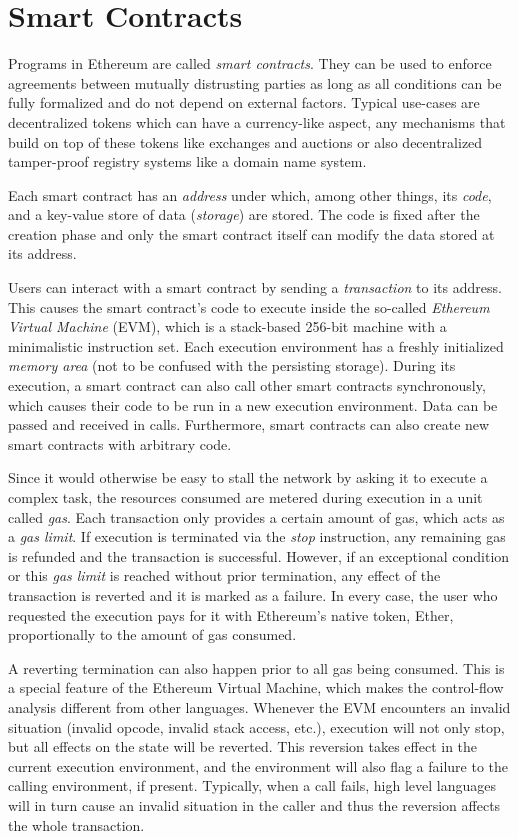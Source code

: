 \section{Smart Contracts}
\label{section:smart_contracts}

Programs in Ethereum are called \emph{smart contracts}.
They can be used to enforce agreements between
mutually distrusting parties as long as all conditions can be fully formalized
and do not depend on external factors. Typical use-cases are decentralized
tokens which can have a currency-like aspect, any mechanisms that build
on top of these tokens like exchanges and auctions or also decentralized
tamper-proof registry systems like a domain name system.

Each smart contract has an \emph{address} under which, among other things, its \emph{code},
and a key-value store of data (\emph{storage}) are stored. The code is fixed after the creation phase
and only the smart contract itself can modify the data stored at its address.

Users can interact with a smart contract by sending a \emph{transaction}
to its address. This causes the smart contract's code to execute inside
the so-called \emph{Ethereum Virtual Machine} (EVM), which is a stack-based
256-bit machine with a minimalistic instruction set. Each execution environment
has a freshly initialized \emph{memory area} (not to be confused with the persisting
storage). During its execution, a smart contract can also call other
smart contracts synchronously, which causes their code to be run in
a new execution environment. Data can be passed and received in calls.
Furthermore, smart contracts can also create new smart contracts with
arbitrary code.

Since it would otherwise be easy to stall the network by asking it to
execute a complex task, the resources consumed are metered during execution
in a unit called \emph{gas}. Each transaction only provides a certain
amount of gas, which acts as a \emph{gas limit}. If execution is terminated via the \emph{stop} instruction,
any remaining gas is refunded and the transaction is successful.
However, if an exceptional condition or this \emph{gas limit} is reached without
prior termination, any effect of the transaction is reverted and it is marked as a failure.
In every case, the user
who requested the execution pays for it with Ethereum's native token,
Ether, proportionally to the amount of gas consumed.

A reverting termination can also happen prior to all gas being consumed. This is
a special feature of the Ethereum Virtual Machine,
which makes the control-flow analysis different from other languages.
Whenever the EVM encounters an invalid situation (invalid opcode, invalid
stack access, etc.), execution will not only stop, but all effects on the
state will be reverted. This reversion takes effect in the current execution
environment, and the environment will also
flag a failure to the calling environment, if present. Typically,
when a call fails, high level languages will in turn cause an
invalid situation in the caller and thus the reversion
affects the whole transaction.

